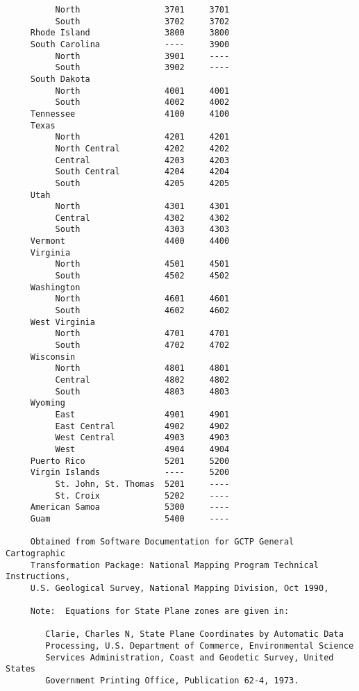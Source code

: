\begin{verbatim}
          North                 3701     3701
          South                 3702     3702
     Rhode Island               3800     3800
     South Carolina             ----     3900
          North                 3901     ----
          South                 3902     ----
     South Dakota
          North                 4001     4001
          South                 4002     4002
     Tennessee                  4100     4100
     Texas
          North                 4201     4201
          North Central         4202     4202
          Central               4203     4203
          South Central         4204     4204
          South                 4205     4205
     Utah
          North                 4301     4301
          Central               4302     4302
          South                 4303     4303
     Vermont                    4400     4400
     Virginia
          North                 4501     4501
          South                 4502     4502
     Washington
          North                 4601     4601
          South                 4602     4602
     West Virginia
          North                 4701     4701
          South                 4702     4702
     Wisconsin
          North                 4801     4801
          Central               4802     4802
          South                 4803     4803
     Wyoming
          East                  4901     4901
          East Central          4902     4902
          West Central          4903     4903
          West                  4904     4904
     Puerto Rico                5201     5200
     Virgin Islands             ----     5200
          St. John, St. Thomas  5201     ----
          St. Croix             5202     ----
     American Samoa             5300     ----
     Guam                       5400     ----

     Obtained from Software Documentation for GCTP General Cartographic
     Transformation Package: National Mapping Program Technical Instructions,
     U.S. Geological Survey, National Mapping Division, Oct 1990,

     Note:  Equations for State Plane zones are given in:

        Clarie, Charles N, State Plane Coordinates by Automatic Data
        Processing, U.S. Department of Commerce, Environmental Science
        Services Administration, Coast and Geodetic Survey, United States
        Government Printing Office, Publication 62-4, 1973.
\end{verbatim}
